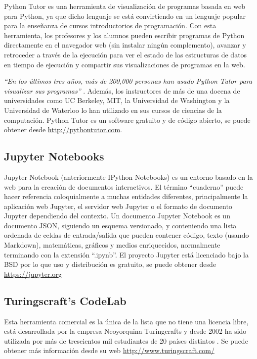 Python Tutor es una herramienta de visualización de programas basada en web para Python, ya que dicho lenguaje se está convirtiendo en un lenguaje popular para la enseñanza de cursos introductorios de programación. Con esta herramienta, los profesores y los alumnos pueden escribir programas de Python directamente en el navegador web (sin instalar ningún complemento), avanzar y retroceder a través de la ejecución para ver el estado de las estructuras de datos en tiempo de ejecución y compartir sus visualizaciones de programas en la web.

\textit{``En los últimos tres años, más de 200,000 personas han usado Python Tutor para visualizar sus programas''} \cite{GuoSIGCSE2013}. Además, los instructores de más de una docena de universidades como UC Berkeley, MIT, la Universidad de Washington y la Universidad de Waterloo lo han utilizado en sus cursos de ciencias de la computación. Python Tutor es un software gratuito y de código abierto, se puede obtener desde \url{http://pythontutor.com}.


\subsection {Jupyter Notebooks}

Jupyter Notebook (anteriormente IPython Notebooks) es un entorno basado en la web para la creación de documentos interactivos. El término ``cuaderno'' puede hacer referencia coloquialmente a muchas entidades diferentes, principalmente la aplicación web Jupyter, el servidor web Jupyter o el formato de documento Jupyter dependiendo del contexto. Un documento Jupyter Notebook es un documento JSON, siguiendo un esquema versionado, y conteniendo una lista ordenada de celdas de entrada/salida que pueden contener código, texto (usando Markdown), matemáticas, gráficos y medios enriquecidos, normalmente terminando con la extensión ``.ipynb''. El proyecto Jupyter está licenciado bajo la BSD por lo que uso y distribución es gratuito, se puede obtener desde \url{https://jupyter.org}

\subsection {Turingscraft's CodeLab}

Esta herramienta comercial es la única de la lista que no tiene una licencia libre, está desarrollada por la empresa Neoyorquina Turingcrafts y desde 2002 ha sido utilizada por más de trescientos mil estudiantes de 20 países distintos \cite{barr_using_2016}. Se puede obtener más información desde su web \url{http://www.turingscraft.com/}


